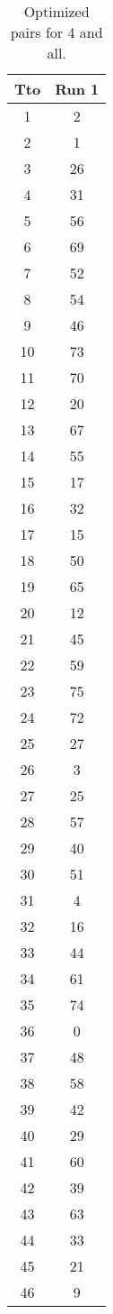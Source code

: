 \begin{table}
  \centering
  \scriptsize
  \caption{Optimized pairs for 4 and all.}
  \label{tab_pairs}
\begin{tabular}{c c }
\hline
Tto & Run 1 \\
\hline
1 & 2 \\
2 & 1 \\
3 & 26 \\
4 & 31 \\
5 & 56 \\
6 & 69 \\
7 & 52 \\
8 & 54 \\
9 & 46 \\
10 & 73 \\
11 & 70 \\
12 & 20 \\
13 & 67 \\
14 & 55 \\
15 & 17 \\
16 & 32 \\
17 & 15 \\
18 & 50 \\
19 & 65 \\
20 & 12 \\
21 & 45 \\
22 & 59 \\
23 & 75 \\
24 & 72 \\
25 & 27 \\
26 & 3 \\
27 & 25 \\
28 & 57 \\
29 & 40 \\
30 & 51 \\
31 & 4 \\
32 & 16 \\
33 & 44 \\
34 & 61 \\
35 & 74 \\
36 & 0 \\
37 & 48 \\
38 & 58 \\
39 & 42 \\
40 & 29 \\
41 & 60 \\
42 & 39 \\
43 & 63 \\
44 & 33 \\
45 & 21 \\
46 & 9 \\

\end{tabular}
\end{table}
